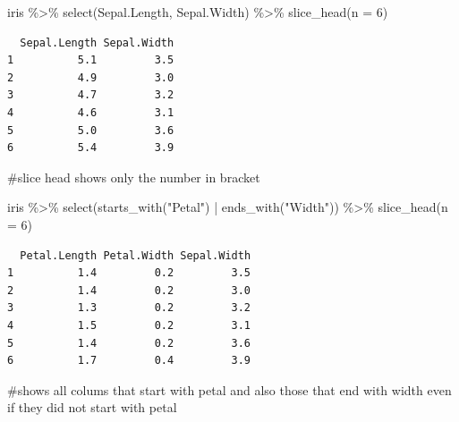 \documentclass[
  letterpaper,
  DIV=11,
  numbers=noendperiod]{scrartcl}
\newenvironment{Shaded}{\begin{snugshade}}{\end{snugshade}}
\newcommand{\AttributeTok}[1]{\textcolor[rgb]{0.40,0.45,0.13}{#1}}
\newcommand{\CommentTok}[1]{\textcolor[rgb]{0.37,0.37,0.37}{#1}}
\newcommand{\DecValTok}[1]{\textcolor[rgb]{0.68,0.00,0.00}{#1}}
\newcommand{\FunctionTok}[1]{\textcolor[rgb]{0.28,0.35,0.67}{#1}}
\newcommand{\NormalTok}[1]{\textcolor[rgb]{0.00,0.23,0.31}{#1}}
\newcommand{\SpecialCharTok}[1]{\textcolor[rgb]{0.37,0.37,0.37}{#1}}
\newcommand{\StringTok}[1]{\textcolor[rgb]{0.13,0.47,0.30}{#1}}
\begin{document}
\begin{Shaded}
\begin{Highlighting}[]
\NormalTok{iris }\SpecialCharTok{\%\textgreater{}\%}
    \FunctionTok{select}\NormalTok{(Sepal.Length, Sepal.Width) }\SpecialCharTok{\%\textgreater{}\%} 
    \FunctionTok{slice\_head}\NormalTok{(}\AttributeTok{n =} \DecValTok{6}\NormalTok{)}
\end{Highlighting}
\end{Shaded}

\begin{verbatim}
  Sepal.Length Sepal.Width
1          5.1         3.5
2          4.9         3.0
3          4.7         3.2
4          4.6         3.1
5          5.0         3.6
6          5.4         3.9
\end{verbatim}

\begin{Shaded}
\begin{Highlighting}[]
\CommentTok{\#slice head shows only the number in bracket}
\end{Highlighting}
\end{Shaded}

\begin{Shaded}
\begin{Highlighting}[]
\NormalTok{iris }\SpecialCharTok{\%\textgreater{}\%}
    \FunctionTok{select}\NormalTok{(}\FunctionTok{starts\_with}\NormalTok{(}\StringTok{"Petal"}\NormalTok{) }\SpecialCharTok{|} \FunctionTok{ends\_with}\NormalTok{(}\StringTok{"Width"}\NormalTok{)) }\SpecialCharTok{\%\textgreater{}\%} 
    \FunctionTok{slice\_head}\NormalTok{(}\AttributeTok{n =} \DecValTok{6}\NormalTok{)}
\end{Highlighting}
\end{Shaded}

\begin{verbatim}
  Petal.Length Petal.Width Sepal.Width
1          1.4         0.2         3.5
2          1.4         0.2         3.0
3          1.3         0.2         3.2
4          1.5         0.2         3.1
5          1.4         0.2         3.6
6          1.7         0.4         3.9
\end{verbatim}

\begin{Shaded}
\begin{Highlighting}[]
\CommentTok{\#shows all colums that start with petal and also those that end with width even if they did not start with petal}
\end{Highlighting}
\end{Shaded}
\end{document}
